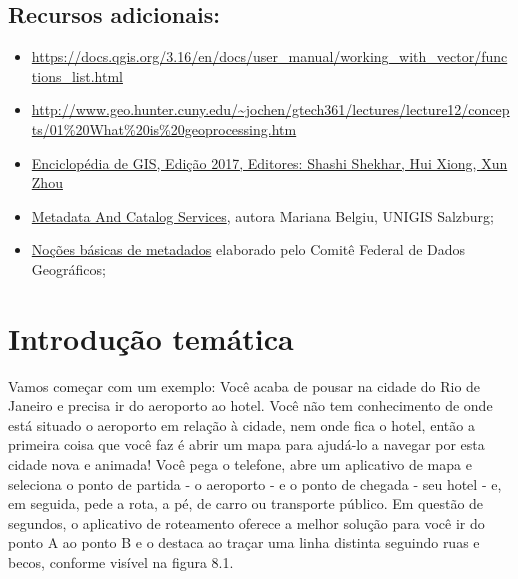 \documentclass[
  portuguese,
]{krantz}
\providecommand{\tightlist}{%
  \setlength{\itemsep}{0pt}\setlength{\parskip}{0pt}}
\begin{document}
\hypertarget{recursos-adicionais-8}{%
\subsection{Recursos adicionais:}\label{recursos-adicionais-8}}

\begin{itemize}
\tightlist
\item
  \href{https://docs.qgis.org/3.16/en/docs/user_manual/\%20working_with_vector/functions_list.html}{https://docs.qgis.org/3.16/en/docs/user\_manual/working\_with\_vector/functions\_list.html}
\item
  \href{http://www.\%20geo.hunter.cuny.edu/~jochen/gtech361/lectures/lecture12/concepts/01\%20What\%20is\%20geoprocessing.htm}{http://www.geo.hunter.cuny.edu/\textasciitilde jochen/gtech361/lectures/lecture12/concepts/01\%20What\%20is\%20geoprocessing.htm}
\item
  \href{https://link.springer.com/referencework/10.1007/978-3-319-17885-1}{Enciclopédia de GIS, Edição 2017, Editores: Shashi Shekhar, Hui Xiong, Xun Zhou}{ }
\item
  \href{https://www.geo-train.eu/modules/metadata/pdf/Metadata.pdf}{Metadata And Catalog Services}, autora Mariana Belgiu, UNIGIS Salzburg;
\item
  \href{https://www.fgdc.gov/resources/factsheets/documents/GeospatialMetadata-July2011.pdf}{Noções básicas de metadados} elaborado pelo Comitê Federal de Dados Geográficos;
\end{itemize}

\hypertarget{introduuxe7uxe3o-temuxe1tica-7}{%
\section{Introdução temática}\label{introduuxe7uxe3o-temuxe1tica-7}}

Vamos começar com um exemplo: Você acaba de pousar na cidade do Rio de Janeiro e precisa ir do aeroporto ao hotel. Você não tem conhecimento de onde está situado o aeroporto em relação à cidade, nem onde fica o hotel, então a primeira coisa que você faz é abrir um mapa para ajudá-lo a navegar por esta cidade nova e animada! Você pega o telefone, abre um aplicativo de mapa e seleciona o ponto de partida - o aeroporto - e o ponto de chegada - seu hotel - e, em seguida, pede a rota, a pé, de carro ou transporte público. Em questão de segundos, o aplicativo de roteamento oferece a melhor solução para você ir do ponto A ao ponto B e o destaca ao traçar uma linha distinta seguindo ruas e becos, conforme visível na figura 8.1.
\end{document}
